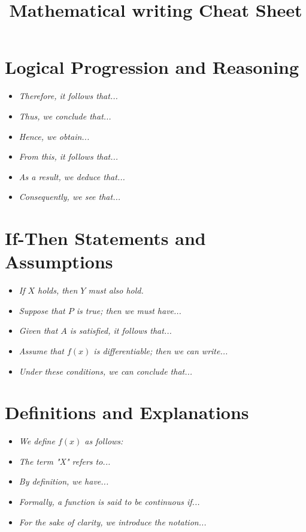 \documentclass[10pt,letterpaper,oneside,reqno]{amsart}
\title[Mathematical writing Cheat Sheet]
{Mathematical writing Cheat Sheet}
\begin{document}
    \maketitle

    \begin{multicols}{2}

        \section*{Logical Progression and Reasoning}
        \begin{itemize}
            \item \textit{Therefore, it follows that...}
            \item \textit{Thus, we conclude that...}
            \item \textit{Hence, we obtain...}
            \item \textit{From this, it follows that...}
            \item \textit{As a result, we deduce that...}
            \item \textit{Consequently, we see that...}
        \end{itemize}

        \section*{If-Then Statements and Assumptions}
        \begin{itemize}
            \item \textit{If \( X \) holds, then \( Y \) must also hold.}
            \item \textit{Suppose that \( P \) is true; then we must have...}
            \item \textit{Given that \( A \) is satisfied, it follows that...}
            \item \textit{Assume that \( f(x) \) is differentiable; then we can write...}
            \item \textit{Under these conditions, we can conclude that...}
        \end{itemize}

        \section*{Definitions and Explanations}
        \begin{itemize}
            \item \textit{We define \( f(x) \) as follows:}
            \item \textit{The term "X" refers to...}
            \item \textit{By definition, we have...}
            \item \textit{Formally, a function is said to be continuous if...}
            \item \textit{For the sake of clarity, we introduce the notation...}
        \end{itemize}


\end{multicols}
\end{document}
